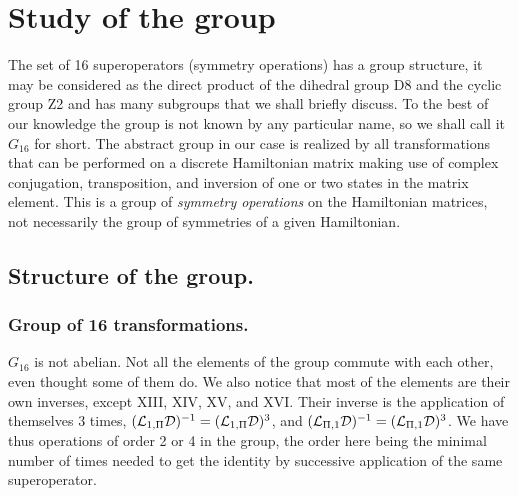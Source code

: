 {%


%
%
%
\section{Study of the group \label{groups}}
%
%
%
The set of 16 superoperators (symmetry operations)  has a group structure, it may be considered as the direct product of the dihedral group D8 and the cyclic group Z2 and has many subgroups that we shall briefly discuss. To the best of our knowledge the group is not known by any particular name, so we shall  call it $G_{16}$ for short.
The abstract group in our case is realized by all transformations that can be performed on a discrete Hamiltonian matrix making use of complex conjugation, transposition, and inversion of one or two states in the matrix element. This is a group of {\it symmetry operations} on the Hamiltonian matrices, not necessarily the group of symmetries of a given Hamiltonian.

%
%
%
\subsection{Structure of the group.}
%
%
%



%
%
\subsubsection{Group of 16 transformations.}
%
%
$G_{16}$ is not abelian. Not all the elements of the group
commute with each other, even thought some of them do.
We also notice that most of the elements are their own inverses, except XIII, XIV, XV, and XVI.
Their inverse is the application of themselves 3 times,  $({\cal{L}}_{1,\Pi}{\cal{D}})^{-1}=({\cal{L}}_{1,\Pi}{\cal{D}})^{3}$, and $({\cal{L}}_{\Pi,1}{\cal{D}})^{-1}=({\cal{L}}_{\Pi,1}{\cal{D}})^{3}$.
We have thus operations of order 2 or 4 in the group, the order here  being the minimal number of times needed to get the identity by successive application of the same superoperator.

}
